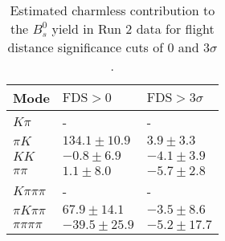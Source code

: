 \begin{table}[h]
  \centering
  \begin{tabular}{lll}
      \toprule
      Mode & $\mathrm{FDS} > 0$ & $\mathrm{FDS} > 3\sigma$ \\
      \midrule
      $K\pi$ & \-- & \-- \\
      $\pi K$ & $134.1 \pm 10.9$ & $3.9 \pm 3.3$ \\
      $KK$ & $-0.8 \pm 6.9$ & $-4.1 \pm 3.9$ \\
      $\pi\pi$ & $1.1 \pm 8.0$ & $-5.7 \pm 2.8$ \\
      $K\pi\pi\pi$ & \-- & \-- \\
      $\pi K\pi\pi$ & $67.9 \pm 14.1$ & $-3.5 \pm 8.6$ \\
      $\pi\pi\pi\pi$ & $-39.5 \pm 25.9$ & $-5.2 \pm 17.7$ \\
      \bottomrule
  \end{tabular}
  \caption{\small Estimated charmless contribution to the $B^{0}_{s}$ yield in Run 2 data for flight distance significance cuts of 0  and $3\sigma$.}
\label{tab:charmless_yields_Bs_run_2}
\end{table}

